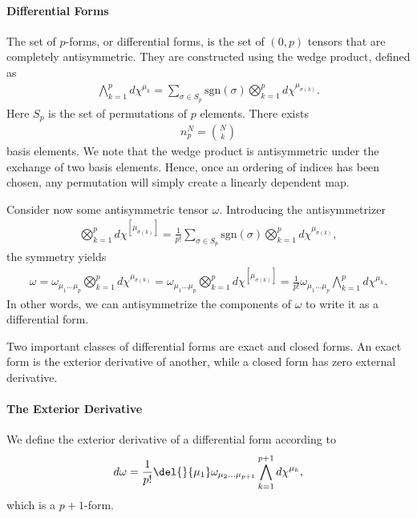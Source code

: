 \paragraph{Differential Forms}
The set of $p$-forms, or differential forms, is the set of $(0, p)$ tensors that are completely antisymmetric. They are constructed using the wedge product, defined as
\begin{align*}
	\bigwedge\limits_{k = 1}^{p}d\chi^{\mu_{k}} = \sum\limits_{\sigma\in S_{p}}\text{sgn}(\sigma)\bigotimes_{k = 1}^{p}d\chi^{\mu_{\sigma(k)}}.
\end{align*}
Here $S_{p}$ is the set of permutations of $p$ elements. There exists
\begin{align*}
	n_{p}^{N} = {N\choose k}
\end{align*}
basis elements. We note that the wedge product is antisymmetric under the exchange of two basis elements. Hence, once an ordering of indices has been chosen, any permutation will simply create a linearly dependent map.

Consider now some antisymmetric tensor $\omega$. Introducing the antisymmetrizer
\begin{align*}
	\bigotimes_{k = 1}^{p}d\chi^{[\mu_{\sigma(k)}]} = \frac{1}{p!}\sum\limits_{\sigma\in S_{p}}\text{sgn}(\sigma)\bigotimes_{k = 1}^{p}d\chi^{\mu_{\sigma(k)}},
\end{align*}
the symmetry yields
\begin{align*}
	\omega = \omega_{\mu_{1}\dots \mu_{p}}\bigotimes_{k = 1}^{p}d\chi^{\mu_{\sigma(k)}} = \omega_{\mu_{1}\dots \mu_{p}}\bigotimes_{k = 1}^{p}d\chi^{[\mu_{\sigma(k)}]} = \frac{1}{p!}\omega_{\mu_{1}\dots \mu_{p}}\bigwedge\limits_{k = 1}^{p}d\chi^{\mu_{k}}.
\end{align*}
In other words, we can antisymmetrize the components of $\omega$ to write it as a differential form.

Two important classes of differential forms are exact and closed forms. An exact form is the exterior derivative of another, while a closed form has zero external derivative.

\paragraph{The Exterior Derivative}
We define the exterior derivative of a differential form according to
\begin{align*}
	d\omega = \frac{1}{p!}\del{}{\mu_{1}}\omega_{\mu_{2}\dots \mu_{p + 1}}\bigwedge\limits_{k = 1}^{p + 1}d\chi^{\mu_{k}},
\end{align*}
which is a $p + 1$-form.

